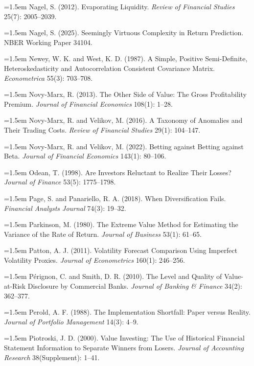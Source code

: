 \hangindent=1.5em Nagel, S. (2012). Evaporating Liquidity. \emph{Review of Financial Studies} 25(7): 2005--2039.

\hangindent=1.5em Nagel, S. (2025). Seemingly Virtuous Complexity in Return Prediction. NBER Working Paper 34104.

\hangindent=1.5em Newey, W. K. and West, K. D. (1987). A Simple, Positive Semi-Definite, Heteroskedasticity and Autocorrelation Consistent Covariance Matrix. \emph{Econometrica} 55(3): 703--708.

\hangindent=1.5em Novy-Marx, R. (2013). The Other Side of Value: The Gross Profitability Premium. \emph{Journal of Financial Economics} 108(1): 1--28.

\hangindent=1.5em Novy-Marx, R. and Velikov, M. (2016). A Taxonomy of Anomalies and Their Trading Costs. \emph{Review of Financial Studies} 29(1): 104--147.

\hangindent=1.5em Novy-Marx, R. and Velikov, M. (2022). Betting against Betting against Beta. \emph{Journal of Financial Economics} 143(1): 80--106.

\hangindent=1.5em Odean, T. (1998). Are Investors Reluctant to Realize Their Losses? \emph{Journal of Finance} 53(5): 1775--1798.

\hangindent=1.5em Page, S. and Panariello, R. A. (2018). When Diversification Fails. \emph{Financial Analysts Journal} 74(3): 19--32.

\hangindent=1.5em Parkinson, M. (1980). The Extreme Value Method for Estimating the Variance of the Rate of Return. \emph{Journal of Business} 53(1): 61--65.

\hangindent=1.5em Patton, A. J. (2011). Volatility Forecast Comparison Using Imperfect Volatility Proxies. \emph{Journal of Econometrics} 160(1): 246--256.

\hangindent=1.5em P\'erignon, C. and Smith, D. R. (2010). The Level and Quality of Value-at-Risk Disclosure by Commercial Banks. \emph{Journal of Banking \& Finance} 34(2): 362--377.

\hangindent=1.5em Perold, A. F. (1988). The Implementation Shortfall: Paper versus Reality. \emph{Journal of Portfolio Management} 14(3): 4--9.

\hangindent=1.5em Piotroski, J. D. (2000). Value Investing: The Use of Historical Financial Statement Information to Separate Winners from Losers. \emph{Journal of Accounting Research} 38(Supplement): 1--41.

